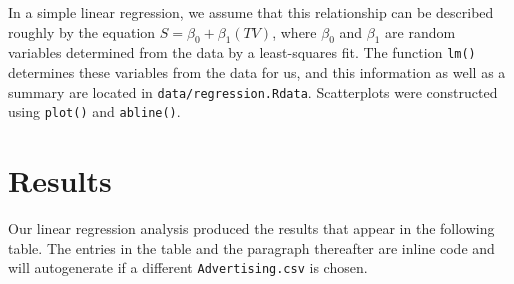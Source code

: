 \documentclass{article}
\begin{document}
In a simple linear regression, we assume that this relationship can be described roughly by the equation $S = \beta_0+\beta_1(TV)$, where $\beta_0$ and $\beta_1$ are random variables determined from the data by a least-squares fit. The function \texttt{lm()} determines these variables from the data for us, and this information as well as a summary are located in \texttt{data/regression.Rdata}.  Scatterplots were constructed using \texttt{plot()} and \texttt{abline()}.

\section{Results}

Our linear regression analysis produced the results that appear in the following table.  The entries in the table and the paragraph thereafter are inline code and will autogenerate if a different \texttt{Advertising.csv} is chosen. 
\end{document}
